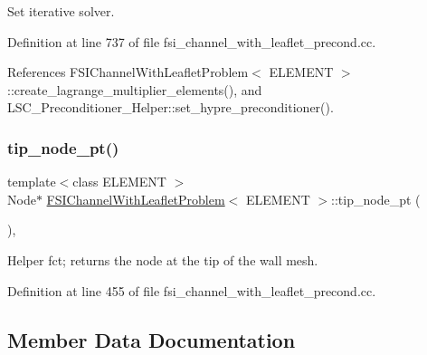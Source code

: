 Set iterative solver. 



Definition at line 737 of file fsi\+\_\+channel\+\_\+with\+\_\+leaflet\+\_\+precond.\+cc.



References F\+S\+I\+Channel\+With\+Leaflet\+Problem$<$ E\+L\+E\+M\+E\+N\+T $>$\+::create\+\_\+lagrange\+\_\+multiplier\+\_\+elements(), and L\+S\+C\+\_\+\+Preconditioner\+\_\+\+Helper\+::set\+\_\+hypre\+\_\+preconditioner().

\mbox{\label{classFSIChannelWithLeafletProblem_a00605fef274ac93454d59b525ba4d923}} 
\subsubsection{\texorpdfstring{tip\+\_\+node\+\_\+pt()}{tip\_node\_pt()}}
{\footnotesize\ttfamily template$<$class E\+L\+E\+M\+E\+NT $>$ \\
Node$\ast$ \hyperlink{classFSIChannelWithLeafletProblem}{F\+S\+I\+Channel\+With\+Leaflet\+Problem}$<$ E\+L\+E\+M\+E\+NT $>$\+::tip\+\_\+node\+\_\+pt (\begin{DoxyParamCaption}{ }\end{DoxyParamCaption})\hspace{0.3cm}{\ttfamily [inline]}, {\ttfamily [private]}}



Helper fct; returns the node at the tip of the wall mesh. 



Definition at line 455 of file fsi\+\_\+channel\+\_\+with\+\_\+leaflet\+\_\+precond.\+cc.



\subsection{Member Data Documentation}
\mbox{\label{classFSIChannelWithLeafletProblem_a336bdec3a8b90ac09feb89e5bb3539e8}} 
